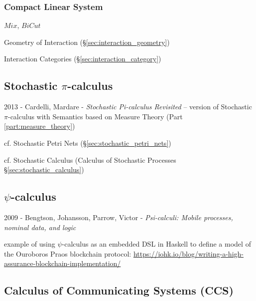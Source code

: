 \subsubsection{Compact Linear System}\label{sec:compact_linear_system}

\cite{abramsky-gay-nagarajan96}

$Mix$, $BiCut$

\cite{wadler12}

Geometry of Interaction (\S\ref{sec:interaction_geometry})

Interaction Categories (\S\ref{sec:interaction_category})



\subsection{Stochastic $\pi$-calculus}\label{sec:stochastic_pi_calculus}

2013 - Cardelli, Mardare - \emph{Stochastic Pi-calculus Revisited} -- version of
Stochastic $\pi$-calculus with Semantics based on Measure Theory (Part
\ref{part:measure_theory})

\fist cf. Stochastic Petri Nets (\S\ref{sec:stochastic_petri_nets})

cf. Stochastic Calculus (Calculus of Stochastic Processes
\S\ref{sec:stochastic_calculus})



\subsection{$\psi$-calculus}\label{sec:psi_calculus}

2009 - Bengtson, Johansson, Parrow, Victor - \emph{Psi-calculi: Mobile
  processes, nominal data, and logic}

example of using $\psi$-calculus as an embedded DSL in Haskell to define a
model of the Ouroboros Praos blockchain protocol:
\url{https://iohk.io/blog/writing-a-high-assurance-blockchain-implementation/}



\subsection{Calculus of Communicating Systems (CCS)}\label{sec:ccs}

